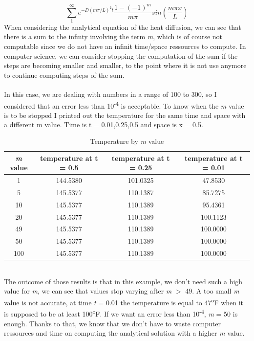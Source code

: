 \documentclass[12pt, a4paper]{report}
\begin{document}
\paragraph{}
\begin{equation}
\sum_{1}^{\infty}e^{-D(m\pi/L)^{2}t}\frac{1-(-1)^{m}}{m\pi}sin(\frac{m\pi x}{L})
\end{equation}
When considering the analytical equation of the heat diffusion, we can see that there is a sum to the infinty involving the term \textit{m}, which is of course not computable since we do not have an infinit time/space ressources to compute. In computer science, we can consider stopping the computation of the sum if the steps are becoming smaller and smaller, to the point where it is not use anymore to continue computing steps of the sum.
\paragraph{}
In this case, we are dealing with numbers in a range of 100 to 300, so I considered that an error less than 10\textsuperscript{-4} is acceptable. To know when the \textit{m} value is to be stopped I printed out the temperature for the same time and space with a different m value. Time is t = 0.01,0.25,0.5 and space is x = 0.5.
\begin{table}[ht]
\centering
\begin{tabular}{c c c c}
\toprule
\textit{m} value & temperature at t = 0.5 & temperature at t = 0.25 & temperature at t = 0.01 \\
\midrule
1 &144.5380&101.0325&47.8530\\
5 &145.5377&110.1387&85.7275\\
10 &145.5377&110.1389&95.4361\\
20 &145.5377&110.1389&100.1123\\
49 &145.5377&110.1389&100.0000\\
50 &145.5377&110.1389&100.0000\\
100 &145.5377&110.1389&100.0000\\
\end{tabular}
\caption{Temperature by \textit{m} value}
\end{table}\\

The outcome of those results is that in this example, we don't need such a high value for \textit{m}, we can see that values stop varying after \textit{m} $>$ 49. A too small \textit{m} value is not accurate, at time \textit{t} = 0.01 the temperature is equal to 47\textsuperscript{o}F when it is supposed to be at least 100\textsuperscript{o}F. If we want an error less than 10\textsuperscript{-4}, \textit{m} = 50 is enough. Thanks to that, we know that we don't have to waste computer ressources and time on computing the analytical solution with a higher \textit{m} value.
\end{document}
